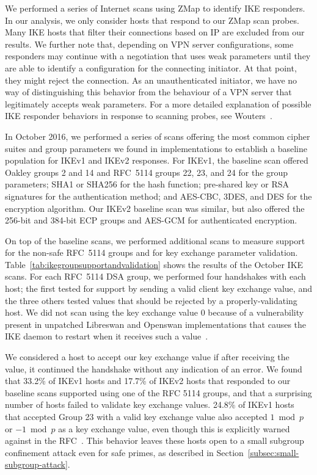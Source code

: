 We performed a series of Internet scans using ZMap to identify IKE responders.
In our analysis, we only consider hosts that respond to our ZMap scan probes.
Many IKE hosts that filter their connections based on IP are excluded from our
results.  We further note that, depending on VPN server configurations, some
responders may continue with a negotiation that uses weak parameters until they
are able to identify a configuration for the connecting initiator. At that
point, they might reject the connection. As an unauthenticated initiator, we
have no way of distinguishing this behavior from the behaviour of a VPN server
that legitimately accepts weak parameters. For a more detailed explanation of
possible IKE responder behaviors in response to scanning probes, see
Wouters~\cite{paul-wouters}.

In October 2016, we performed a series of scans offering the most common cipher
suites and group parameters we found in implementations to establish a baseline
population for IKEv1 and IKEv2 responses. For IKEv1, the baseline scan offered
Oakley groups 2 and 14 and RFC~5114 groups 22, 23, and 24 for the group
parameters; SHA1 or SHA256 for the hash function; pre-shared key or RSA
signatures for the authentication method; and AES-CBC, 3DES, and DES for the
encryption algorithm.  Our IKEv2 baseline scan was similar, but also offered
the 256-bit and 384-bit ECP groups and AES-GCM for authenticated encryption.

On top of the baseline scans, we performed additional scans to measure support
for the non-safe RFC~5114 groups and for key exchange parameter validation.
Table~\ref{tab:ikegroupsupportandvalidation} shows the results of the October
IKE scans.  For each RFC~5114 DSA group, we performed four handshakes with each
host; the first tested for support by sending a valid client key exchange
value, and the three others tested values that should be rejected by a
properly-validating host. We did not scan using the key exchange value $0$
because of a vulnerability present in unpatched Libreswan and Openswan
implementations that causes the IKE daemon to restart when it receives such a
value~\cite{cve-2015-3240}.

We considered a host to accept our key exchange value if after receiving the
value, it continued the handshake without any indication of an error. We found
that 33.2\% of IKEv1 hosts and 17.7\% of IKEv2 hosts that responded to our
baseline scans supported using one of the RFC 5114 groups, and that a
surprising number of hosts failed to validate key exchange values.  24.8\% of
IKEv1 hosts that accepted Group 23 with a valid key exchange value also
accepted $1 \bmod p$ or $-1 \bmod p$ as a key exchange value, even though this
is explicitly warned against in the RFC~\cite{rfc2412}.  This behavior leaves
these hosts open to a small subgroup confinement attack even for safe primes,
as described in Section~\ref{subsec:small-subgroup-attack}.

